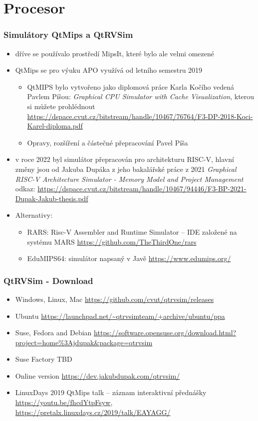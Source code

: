 \documentclass{beamer}
\subtitle{Lekce 03. Central Processing Unit (CPU)}
\author{Pavel Píša \phantom{xxxxxxx} Petr Štěpán \\ \small\texttt{pisa@fel.cvut.cz}\phantom{xxxx}\small\texttt{stepan@fel.cvut.cz}}
\begin{document}
\maketitle

\section{Procesor}

\begin{frame}
\frametitle{Simulátory QtMips a QtRVSim}

\begin{itemize}
\item dříve se používalo prostředí MipsIt, které bylo ale velmi omezené
\item QtMips se pro výuku APO využívá od letního semestru 2019
\begin{itemize}
\item QtMIPS bylo vytvořeno jako diplomová práce Karla Kočího vedená Pavlem Píšou: \textit{Graphical CPU Simulator with Cache Visualization}, kterou si můžete prohlédnout \url{https://dspace.cvut.cz/bitstream/handle/10467/76764/F3-DP-2018-Koci-Karel-diploma.pdf}
\item Opravy, rozšíření a částečné přepracování Pavel Píša
\end{itemize}
\item v roce 2022 byl simulátor přepracován pro architekturu RISC-V, hlavní změny jsou od Jakuba Dupáka z jeho bakalářské práce z 2021 \textit{Graphical RISC-V Architecture Simulator - Memory Model and Project Management} odkaz: \url{https://dspace.cvut.cz/bitstream/handle/10467/94446/F3-BP-2021-Dupak-Jakub-thesis.pdf}
\item Alternativy:
\begin{itemize}
 \item RARS: Risc-V Assembler and Runtime Simulator -- IDE založené na systému MARS \url{https://github.com/TheThirdOne/rars}
 \item EduMIPS64: simulátor napsaný v Javě \url{https://www.edumips.org/}
\end{itemize}
\end{itemize}

\end{frame}


\begin{frame}
\frametitle{QtRVSim - Download}
\begin{itemize}
\item Windows, Linux, Mac \url{https://github.com/cvut/qtrvsim/releases}
\item  Ubuntu \url{https://launchpad.net/~qtrvsimteam/+archive/ubuntu/ppa}
\item Suse, Fedora and Debian \url{https://software.opensuse.org/download.html?project=home\%3Ajdupak\&package=qtrvsim}
\item Suse Factory TBD
\item Online version \url{https://dev.jakubdupak.com/qtrvsim/}
\item LinuxDays 2019 QtMips talk – záznam interaktivní přednášky \url{https://youtu.be/fhcdYtpFsyw}, \url{https://pretalx.linuxdays.cz/2019/talk/EAYAGG/}
\end{itemize}
\end{frame}
\end{document}
